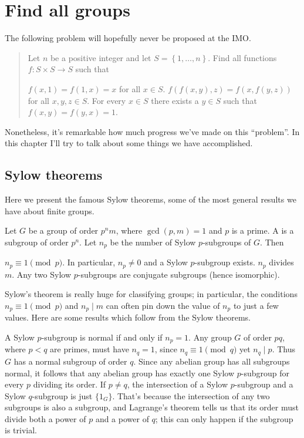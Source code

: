 \chapter{Find all groups}
The following problem will hopefully never be proposed at the IMO.
\begin{quote}
	Let $n$ be a positive integer and let $S = \left\{ 1,\dots,n \right\}$.
	Find all functions $f : S \times S \to S$ such that
	\begin{enumerate}[(a)]
		\ii $f(x,1)=f(1,x)=x$ for all $x \in S$.
		\ii $f(f(x,y),z)=f(x,f(y,z))$ for all $x,y,z \in S$.
		\ii For every $x \in S$ there exists a $y \in S$ such that $f(x,y)=f(y,x)=1$.
	\end{enumerate}
\end{quote}
Nonetheless, it's remarkable how much progress we've made on this ``problem''.
In this chapter I'll try to talk about some things we have accomplished.

\section{Sylow theorems}
Here we present the famous Sylow theorems, some of the most
general results we have about finite groups.

\begin{theorem}
	Let $G$ be a group of order $p^n m$,
	where $\gcd(p,m)=1$ and $p$ is a prime.
	A  is a subgroup of order $p^n$.
	Let $n_p$ be the number of Sylow $p$-subgroups of $G$.
	Then
	\begin{enumerate}[(a)]
		\ii $n_p \equiv 1 \pmod p$. In particular, $n_p \neq 0$ and
		a Sylow $p$-subgroup exists.
		\ii $n_p$ divides $m$.
		\ii Any two Sylow $p$-subgroups are conjugate subgroups (hence isomorphic).
	\end{enumerate}
\end{theorem}


Sylow's theorem is really huge for classifying groups;
in particular, the conditions $n_p \equiv 1 \pmod p$ and $n_p \mid m$
can often pin down the value of $n_p$ to just a few values.
Here are some results which follow from the Sylow theorems.
\begin{itemize}
	\ii A Sylow $p$-subgroup is normal if and only if $n_p = 1$.
	\ii Any group $G$ of order $pq$, where $p < q$ are primes,
	must have $n_q = 1$, since $n_q \equiv 1 \pmod q$ yet $n_q \mid p$.
	Thus $G$ has a normal subgroup of order $q$.
	\ii Since any abelian group has all subgroups normal,
	it follows that any abelian group has exactly one Sylow $p$-subgroup
	for every $p$ dividing its order.
	\ii If $p \neq q$, the intersection of a Sylow $p$-subgroup and a Sylow $q$-subgroup is just $\{1_G\}$.
	That's because the intersection of any two subgroups is also a subgroup,
	and Lagrange's theorem tells us that its order must divide both a power of $p$
	and a power of $q$; this can only happen if the subgroup is trivial.
\end{itemize}

